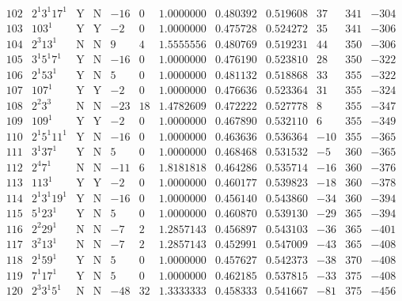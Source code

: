\documentclass[11pt,reqno,a4letter]{article}
\numberwithin{figure}{section}
\numberwithin{table}{section}
\theoremstyle{plain}
\numberwithin{theorem}{section}
\theoremstyle{definition}
\begin{document}
\begin{table}[h!]
\begin{equation*}
{\begin{array}{cc|cc|ccc|cc|ccc}
 102 & 2^1 3^1 17^1 & \text{Y} & \text{N} & -16 & 0 & 1.0000000 & 0.480392 & 0.519608 & 37 & 341 & -304 \\
 103 & 103^1 & \text{Y} & \text{Y} & -2 & 0 & 1.0000000 & 0.475728 & 0.524272 & 35 & 341 & -306 \\
 104 & 2^3 13^1 & \text{N} & \text{N} & 9 & 4 & 1.5555556 & 0.480769 & 0.519231 & 44 & 350 & -306 \\
 105 & 3^1 5^1 7^1 & \text{Y} & \text{N} & -16 & 0 & 1.0000000 & 0.476190 & 0.523810 & 28 & 350 & -322 \\
 106 & 2^1 53^1 & \text{Y} & \text{N} & 5 & 0 & 1.0000000 & 0.481132 & 0.518868 & 33 & 355 & -322 \\
 107 & 107^1 & \text{Y} & \text{Y} & -2 & 0 & 1.0000000 & 0.476636 & 0.523364 & 31 & 355 & -324 \\
 108 & 2^2 3^3 & \text{N} & \text{N} & -23 & 18 & 1.4782609 & 0.472222 & 0.527778 & 8 & 355 & -347 \\
 109 & 109^1 & \text{Y} & \text{Y} & -2 & 0 & 1.0000000 & 0.467890 & 0.532110 & 6 & 355 & -349 \\
 110 & 2^1 5^1 11^1 & \text{Y} & \text{N} & -16 & 0 & 1.0000000 & 0.463636 & 0.536364 & -10 & 355 & -365 \\
 111 & 3^1 37^1 & \text{Y} & \text{N} & 5 & 0 & 1.0000000 & 0.468468 & 0.531532 & -5 & 360 & -365 \\
 112 & 2^4 7^1 & \text{N} & \text{N} & -11 & 6 & 1.8181818 & 0.464286 & 0.535714 & -16 & 360 & -376 \\
 113 & 113^1 & \text{Y} & \text{Y} & -2 & 0 & 1.0000000 & 0.460177 & 0.539823 & -18 & 360 & -378 \\
 114 & 2^1 3^1 19^1 & \text{Y} & \text{N} & -16 & 0 & 1.0000000 & 0.456140 & 0.543860 & -34 & 360 & -394 \\
 115 & 5^1 23^1 & \text{Y} & \text{N} & 5 & 0 & 1.0000000 & 0.460870 & 0.539130 & -29 & 365 & -394 \\
 116 & 2^2 29^1 & \text{N} & \text{N} & -7 & 2 & 1.2857143 & 0.456897 & 0.543103 & -36 & 365 & -401 \\
 117 & 3^2 13^1 & \text{N} & \text{N} & -7 & 2 & 1.2857143 & 0.452991 & 0.547009 & -43 & 365 & -408 \\
 118 & 2^1 59^1 & \text{Y} & \text{N} & 5 & 0 & 1.0000000 & 0.457627 & 0.542373 & -38 & 370 & -408 \\
 119 & 7^1 17^1 & \text{Y} & \text{N} & 5 & 0 & 1.0000000 & 0.462185 & 0.537815 & -33 & 375 & -408 \\
 120 & 2^3 3^1 5^1 & \text{N} & \text{N} & -48 & 32 & 1.3333333 & 0.458333 & 0.541667 & -81 & 375 & -456 \\

\end{array}}
\end{equation*}
\end{table}
\end{document}
